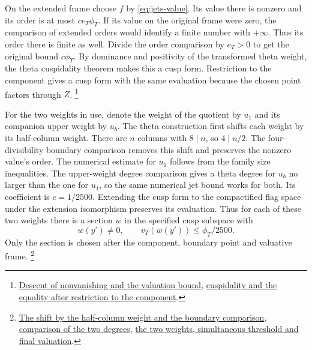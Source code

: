 On the extended frame choose \(f\) by \eqref{eq:jets-value}.
Its value there is nonzero and its order is at most
\(c e_T\phi_T\). If its value on the original frame were zero, the
comparison of extended orders would identify a finite number with
\(+\infty\). Thus its order there is finite as well. Divide the
order comparison by \(e_T>0\) to get the original bound \(c\phi_T\).
By dominance and positivity of the transformed theta weight, the
theta cuspidality theorem makes this a cusp form. Restriction to
the component gives a cusp form with the same evaluation because
the chosen point factors through \(Z\).
\footnote{\href{https://github.com/Deicyde/riemann-hypothesis/blob/40e56bab/src/Development/AutomorphicArithmetic/ThetaCorrespondence/ThetaPairLifts/ThirdPlaceSeries/ExistsCuspWithThetaJetValueLe.lean\#L44-L65}{Descent of nonvanishing and the valuation bound},
\href{https://github.com/Deicyde/riemann-hypothesis/blob/40e56bab/src/Development/AutomorphicArithmetic/ThetaCorrespondence/ThetaPairLifts/ThirdPlaceSeries/ThetaValueOnCuspNeighbourhood.lean\#L29-L57}{cuspidality and the equality after restriction to the component}.}

For the two weights in use, denote the weight of the quotient by
\(u_1\) and its companion upper weight by \(u_b\). The theta
construction first shifts each weight by its half-column weight.
There are \(n\) columns with \(8\mid n\), so \(4\mid n/2\).
The four-divisibility boundary comparison removes this shift and
preserves the nonzero value's order. The numerical estimate for
\(u_1\) follows from the family size inequalities. The upper-weight
degree comparison gives a theta degree for \(u_b\) no larger than
the one for \(u_1\), so the same numerical jet bound works for both.
Its coefficient is \(c=1/2500\). Extending the cusp form to the
compactified flag space under the extension isomorphism preserves its
evaluation. Thus for each of these two weights there is a section
\(w\) in the specified cusp subspace with
\[
            w(y')\ne0,\qquad v_T(w(y'))\le\phi_T/2500.
\]
Only the section is chosen after the component, boundary point and
valuative frame.
\footnote{\href{https://github.com/Deicyde/riemann-hypothesis/blob/40e56bab/src/Development/AutomorphicArithmetic/ThetaCorrespondence/ThetaPairLifts/ThirdPlaceSeries/JetsOfConstantSection.lean\#L26-L49}{The shift by the half-column weight and the boundary comparison},
\href{https://github.com/Deicyde/riemann-hypothesis/blob/40e56bab/src/Development/AutomorphicArithmetic/ThetaCorrespondence/ThetaPairLifts/ThirdPlaceSeries/JetNumUb.lean\#L23-L34}{comparison of the two degrees},
\href{https://github.com/Deicyde/riemann-hypothesis/blob/40e56bab/src/Development/AutomorphicArithmetic/ThetaCorrespondence/ThetaPairLifts/ThirdPlaceSeries/ExistsCuspValueLePhiOfHilbertSamuel.lean\#L24-L50}{the two weights, simultaneous threshold and final valuation}.}

